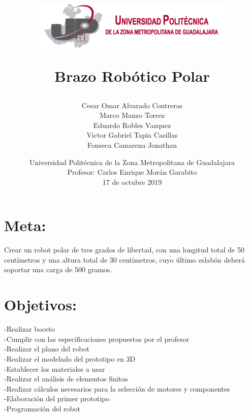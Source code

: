 \documentclass[12pt,a4paper]{report}
\begin{document}
\author{Cesar Omar Alvarado Contreras\\
Marco Manzo Torrez\\
Eduardo Robles Vazquez\\
Victor Gabriel Tapia Casillas\\
Fonseca Camarena Jonathan}

\title{\begin{center}
\includegraphics[scale=1.5]{Escudo.png} 
\end{center}Brazo Robótico Polar}

\date{
Universidad Politécnica de la Zona Metropolitana de Guadalajara\\
Profesor: Carlos Enrique Morán Garabito\\
17 de octubre 2019}

\maketitle
\tableofcontents
\section{Meta:}
Crear un robot polar de tres grados de libertad, con una longitud total de 50 centímetros y una altura total de 30 centímetros, cuyo último eslabón deberá soportar una carga de 500 gramos.
\section{Objetivos:}
\noindent
-Realizar boceto\\
-Cumplir con las especificaciones propuestas por el profesor\\
-Realizar el plano del robot\\
-Realizar el modelado del prototipo en 3D\\
-Establecer los materiales a usar\\ 
-Realizar el análisis de elementos finitos\\
-Realizar cálculos necesarios para la selección de motores y componentes\\
-Elaboración del primer prototipo\\
-Programación del robot\\
\end{document}
